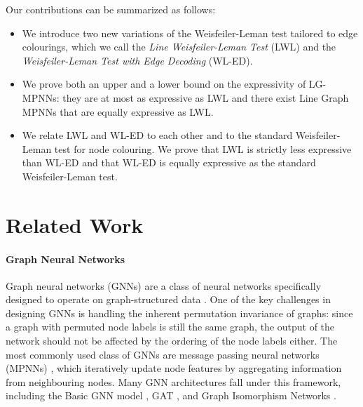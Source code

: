 \documentclass{article}
\begin{document}
Our contributions can be summarized as follows:
\begin{itemize}
    \item We introduce two new variations of the Weisfeiler-Leman test tailored to edge colourings, which we call the \emph{Line Weisfeiler-Leman Test} (LWL) and the \emph{Weisfeiler-Leman Test with Edge Decoding} (WL-ED).
    \item We prove both an upper and a lower bound on the expressivity of LG-MPNNs: they are at most as expressive as LWL and there exist Line Graph MPNNs that are equally expressive as LWL.
    \item We relate LWL and WL-ED to each other and to the standard Weisfeiler-Leman test for node colouring. We prove that LWL is strictly less expressive than WL-ED and that WL-ED is equally expressive as the standard Weisfeiler-Leman test.
\end{itemize}


\section{Related Work}

\paragraph{Graph Neural Networks}
Graph neural networks (GNNs) are a class of neural networks specifically designed to operate on graph-structured data \cite{scarselli2008graph}. One of the key challenges in designing GNNs is handling the inherent permutation invariance of graphs: since a graph with permuted node labels is still the same graph, the output of the network should not be affected by the ordering of the node labels either.
The most commonly used class of GNNs are message passing neural networks (MPNNs) \cite{gilmer2017neural}, which iteratively update node features by aggregating information from neighbouring nodes. Many GNN architectures fall under this framework, including the Basic GNN model \cite{hamilton2020graph}, GAT \cite{velickovic2017graph}, and Graph Isomorphism Networks \cite{xu2018powerful}.
\end{document}
